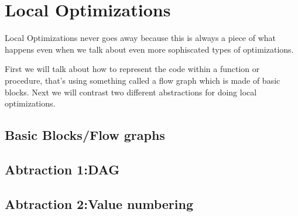 \section{Local Optimizations}

Local Optimizations never goes away because this is always a piece of what happens even when we 
talk about even more sophiscated types of optimizations.

First we will talk about how to represent the code within a function or procedure, that's using 
something called a flow graph which is made of basic blocks.  Next we will contrast two different 
abstractions for doing local optimizations.



\subsection{Basic Blocks/Flow graphs} 



\subsection{Abtraction 1:DAG}



\subsection{Abtraction 2:Value numbering} 





